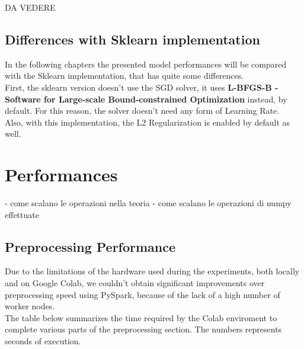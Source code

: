 \documentclass[
	letterpaper, %
	10pt, %
]{class}
\begin{document}
DA VEDERE

\subsection{Differences with Sklearn implementation}

In the following chapters the presented model performances will be compared with the Sklearn implementation, that has quite some differences.\\
First, the sklearn version doesn't use the SGD solver, it uses \textbf{L-BFGS-B - Software for Large-scale Bound-constrained Optimization} instead, by default.
For this reason, the solver doesn't need any form of Learning Rate.\\
Also, with this implementation, the L2 Regularization is enabled by default as well.




\section{Performances}

- come scalano le operazioni nella teoria
- come scalano le operazioni di numpy effettuate

\subsection{Preprocessing Performance}

Due to the limitations of the hardware used during the experiments, both locally and on Google Colab, we couldn't obtain significant improvements over preprocessing speed using PySpark, because of the lack of a high number of worker nodes.\\

The table below summarizes the time required by the Colab enviroment to complete various parts of the preprocessing section.
The numbers represents seconds of execution.
\end{document}

